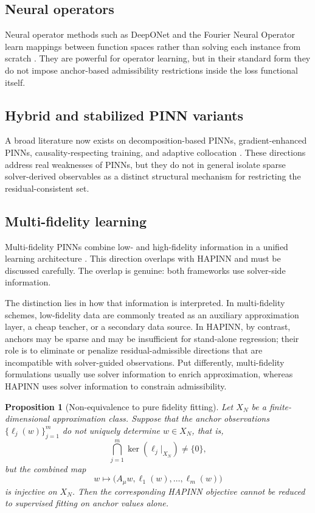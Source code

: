 \documentclass[preprint,12pt]{elsarticle}
\newtheorem{proposition}[theorem]{Proposition}
\theoremstyle{definition}
\numberwithin{equation}{section}
\begin{document}
\subsection{Neural operators}

Neural operator methods such as DeepONet and the Fourier Neural Operator learn mappings between function spaces rather than solving each instance from scratch \cite{DeepONet2021,FNO2021}. They are powerful for operator learning, but in their standard form they do not impose anchor-based admissibility restrictions inside the loss functional itself.

\subsection{Hybrid and stabilized PINN variants}

A broad literature now exists on decomposition-based PINNs, gradient-enhanced PINNs, causality-respecting training, and adaptive collocation \cite{PPINN2020,GradientEnhancedPINN2022,WangCausality2022}. These directions address real weaknesses of PINNs, but they do not in general isolate sparse solver-derived observables as a distinct structural mechanism for restricting the residual-consistent set.

\subsection{Multi-fidelity learning}

Multi-fidelity PINNs combine low- and high-fidelity information in a unified learning architecture \cite{MFPINN2022,MultifidelitySurvey2024}. This direction overlaps with HAPINN and must be discussed carefully. The overlap is genuine: both frameworks use solver-side information.

The distinction lies in how that information is interpreted. In multi-fidelity schemes, low-fidelity data are commonly treated as an auxiliary approximation layer, a cheap teacher, or a secondary data source. In HAPINN, by contrast, anchors may be sparse and may be insufficient for stand-alone regression; their role is to eliminate or penalize residual-admissible directions that are incompatible with solver-guided observations. Put differently, multi-fidelity formulations usually use solver information to enrich approximation, whereas HAPINN uses solver information to constrain admissibility.

\begin{proposition}[Non-equivalence to pure fidelity fitting]
\label{prop:noneq}
Let $X_N$ be a finite-dimensional approximation class. Suppose that the anchor observations $\{\ell_j(w)\}_{j=1}^m$ do not uniquely determine $w\in X_N$, that is,
\[
\bigcap_{j=1}^m \ker(\ell_j|_{X_N})\neq\{0\},
\]
but the combined map
\[
w\mapsto \bigl(A_\mu w,\ell_1(w),\dots,\ell_m(w)\bigr)
\]
is injective on $X_N$. Then the corresponding HAPINN objective cannot be reduced to supervised fitting on anchor values alone.
\end{proposition}
\end{document}

